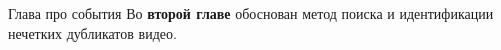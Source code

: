 \documentclass{.local/lib/classes/ndvr-super-article-standalone}
\begin{document}
    \pagebreak
    \begin{content-item}{Глава про события}
        Во \textbf{второй главе} обоснован метод поиска 
        и идентификации нечетких дубликатов видео.


    \end{content-item}
\end{document}
